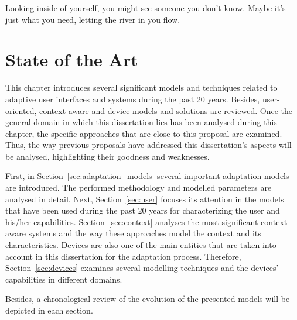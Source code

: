 

\begin{savequote}[50mm]
Looking inside of yourself, you might see someone you don't know. 
Maybe it's just what you need, letting the river in you flow. 
%
\end{savequote}


\chapter{State of the Art}
\label{cha:state_of_the_art}

\ifpdf
    \graphicspath{{2_state_of_the_art/figures/PNG/}{2_state_of_the_art/figures/PDF/}{2_state_of_the_art/figures/}}
\else
    \graphicspath{{2_state_of_the_art/figures/EPS/}{2_state_of_the_art/figures/}}
\fi


This chapter introduces several significant models and techniques related to 
adaptive user interfaces and systems during the past 20 years. Besides, user-oriented,
context-aware and device models and solutions are reviewed. Once the general
domain in which this dissertation lies has been analysed during this chapter,
the specific approaches that are close to this proposal are examined. Thus, 
the way previous proposals have addressed this dissertation's aspects will be 
analysed, highlighting their goodness and weaknesses.  

First, in Section~\ref{sec:adaptation_models} several important adaptation models
are introduced. The performed methodology and modelled parameters are analysed in
detail. Next, Section~\ref{sec:user} focuses its attention in the models
that have been used during the past 20 years for characterizing the user and his/her
capabilities. Section~\ref{sec:context} analyses the most significant
context-aware systems and the way these approaches model the context and its
characteristics. Devices are also one of the main entities that are taken into
account in this dissertation for the adaptation process. Therefore, Section~\ref{sec:devices}
examines several modelling techniques and the devices' capabilities in different
domains.

Besides, a chronological review of the evolution of the presented models will be
depicted in each section.






